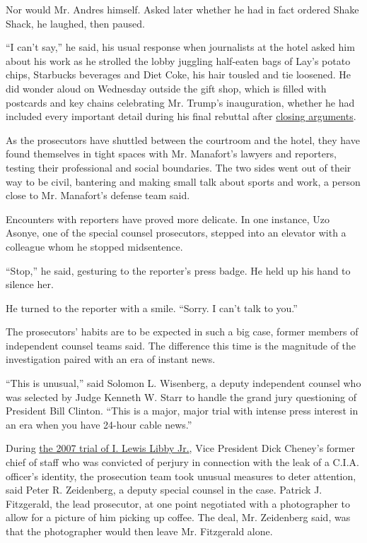 Nor would Mr. Andres himself. Asked later whether he had in fact ordered
Shake Shack, he laughed, then paused.

``I can't say,'' he said, his usual response when journalists at the
hotel asked him about his work as he strolled the lobby juggling
half-eaten bags of Lay's potato chips, Starbucks beverages and Diet
Coke, his hair tousled and tie loosened. He did wonder aloud on
Wednesday outside the gift shop, which is filled with postcards and key
chains celebrating Mr. Trump's inauguration, whether he had included
every important detail during his final rebuttal after
\href{https://www.nytimes3xbfgragh.onion/2018/08/15/us/politics/manafort-trial-closing-arguments.html}{closing
arguments}.

As the prosecutors have shuttled between the courtroom and the hotel,
they have found themselves in tight spaces with Mr. Manafort's lawyers
and reporters, testing their professional and social boundaries. The two
sides went out of their way to be civil, bantering and making small talk
about sports and work, a person close to Mr. Manafort's defense team
said.

Encounters with reporters have proved more delicate. In one instance,
Uzo Asonye, one of the special counsel prosecutors, stepped into an
elevator with a colleague whom he stopped midsentence.

``Stop,'' he said, gesturing to the reporter's press badge. He held up
his hand to silence her.

He turned to the reporter with a smile. ``Sorry. I can't talk to you.''

The prosecutors' habits are to be expected in such a big case, former
members of independent counsel teams said. The difference this time is
the magnitude of the investigation paired with an era of instant news.

``This is unusual,'' said Solomon L. Wisenberg, a deputy independent
counsel who was selected by Judge Kenneth W. Starr to handle the grand
jury questioning of President Bill Clinton. ``This is a major, major
trial with intense press interest in an era when you have 24-hour cable
news.''

During
\href{https://www.nytimes3xbfgragh.onion/2007/03/07/washington/07libby.html}{the
2007 trial of I. Lewis Libby Jr.}, Vice President Dick Cheney's former
chief of staff who was convicted of perjury in connection with the leak
of a C.I.A. officer's identity, the prosecution team took unusual
measures to deter attention, said Peter R. Zeidenberg, a deputy special
counsel in the case. Patrick J. Fitzgerald, the lead prosecutor, at one
point negotiated with a photographer to allow for a picture of him
picking up coffee. The deal, Mr. Zeidenberg said, was that the
photographer would then leave Mr. Fitzgerald alone.

